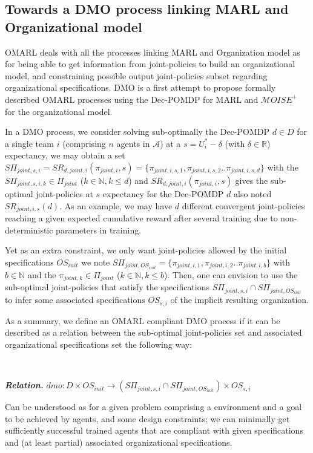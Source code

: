\documentclass{ecai}
\newcounter{relation}
\renewcommand{\therelation}{\arabic{relation}}
\newenvironment{relation}[1][]{%
    \refstepcounter{relation}%
    \noindent \raggedright \textit{\textbf{Relation. \therelation}} \hfill$}
{%
$ \hfill \phantom{x}

}
\begin{document}
\subsection{Towards a DMO process linking MARL and Organizational model}

OMARL deals with all the processes linking MARL and Organization model as for being able to get information from joint-policies to build an organizational model, and constraining possible output joint-policies subset regarding organizational specifications. DMO is a first attempt to propose formally described OMARL processes using the Dec-POMDP for MARL and $\mathcal{M}OISE^+$ for the organizational model.

In a DMO process, we consider solving sub-optimally the Dec-POMDP $d \in D$ for a single team $i$ (comprising $n$ agents in $\mathcal{A}$) at a $s = U_i^* - \delta$ (with $\delta \in \mathbb{R}$) expectancy, we may obtain a set $S\Pi_{joint,s,i} = SR_{d,joint,i}(\pi_{joint,i},s) = \{\pi_{joint,i,s,1}, \pi_{joint,i,s,2} .. \pi_{joint,i,s,d}\}$ with the $S\Pi_{joint,s,i,k} \in \Pi_{joint}$ ($k \in \mathbb{N}, k \leq d$) and $SR_{d,joint,i}(\pi_{joint,i},s)$ gives the sub-optimal joint-policies at $s$ expectancy for the Dec-POMDP $d$ also noted $SR_{joint,i,s}(d)$. As an example, we may have $d$ different convergent joint-policies reaching a given expected cumulative reward after several training due to non-deterministic parameters in training.

Yet as an extra constraint, we only want joint-policies allowed by the initial specifications $OS_{init}$ we note $S\Pi_{joint,OS_{init}} = \{\pi_{joint,i,1}, \pi_{joint,i,2} .. \pi_{joint,i,b}\}$ with $b \in \mathbb{N}$ and the $\pi_{joint,k} \in \Pi_{joint}$ ($k \in \mathbb{N}, k \leq b$). Then, one can envision to use the sub-optimal joint-policies that satisfy the specifications $S\Pi_{joint,s,i} \cap S\Pi_{joint,OS_{init}}$ to infer some associated specifications $OS_{s,i}$ of the implicit resulting organization.

As a summary, we define an OMARL compliant DMO process if it can be described as a relation between the sub-optimal joint-policies set and associated organizational specifications set the following way:

\

\begin{relation}\label{rel:def_dmo}
    dmo: D \times OS_{init} \rightarrow (S\Pi_{joint,s,i} \cap S\Pi_{joint,OS_{init}}) \times OS_{s,i}
\end{relation}
Can be understood as for a given problem comprising a environment and a goal to be achieved by agents, and some design constraints; we can minimally get sufficiently successful trained agents that are compliant with given specifications and (at least partial) associated organizational specifications.
\end{document}
